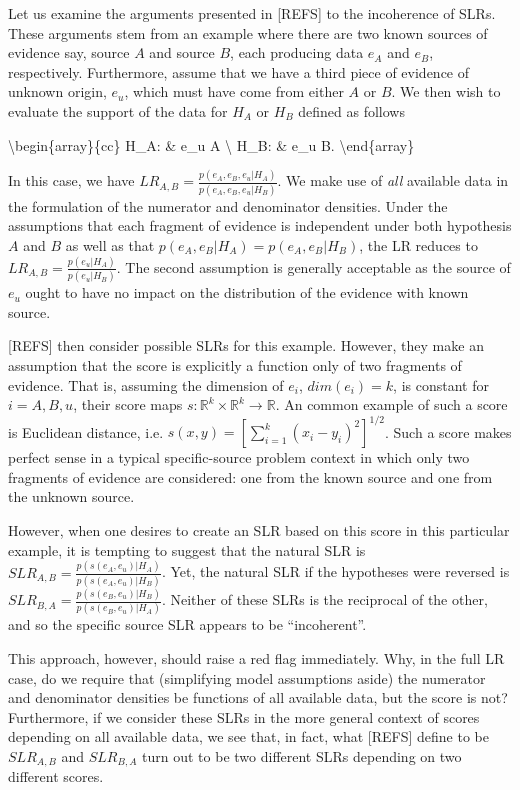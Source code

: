 \documentclass[]{book}
\begin{document}
Let us examine the arguments presented in {[}REFS{]} to the incoherence of SLRs. These arguments stem from an example where there are two known sources of evidence say, source \(A\) and source \(B\), each producing data \(e_A\) and \(e_B\), respectively. Furthermore, assume that we have a third piece of evidence of unknown origin, \(e_u\), which must have come from either \(A\) or \(B\). We then wish to evaluate the support of the data for \(H_A\) or \(H_B\) defined as follows

\textbackslash{}begin\{array\}\{cc\}
H\_A: \& e\_u  A \textbackslash{}
H\_B: \& e\_u  B.
\textbackslash{}end\{array\}

In this case, we have \(LR_{A,B} = \frac{p(e_A, e_B, e_u|H_A)}{p(e_A, e_B, e_u|H_B)}\). We make use of \emph{all} available data in the formulation of the numerator and denominator densities. Under the assumptions that each fragment of evidence is independent under both hypothesis \(A\) and \(B\) as well as that \(p(e_A,e_B|H_A) = p(e_A,e_B|H_B)\), the LR reduces to \(LR_{A,B} = \frac{p(e_u|H_A)}{p(e_u|H_B)}\). The second assumption is generally acceptable as the source of \(e_u\) ought to have no impact on the distribution of the evidence with known source.

{[}REFS{]} then consider possible SLRs for this example. However, they make an assumption that the score is explicitly a function only of two fragments of evidence. That is, assuming the dimension of \(e_i\), \(dim(e_i) = k\), is constant for \(i = A,B,u\), their score maps \(s:\mathbb{R}^k \times \mathbb{R}^k \rightarrow \mathbb{R}\). An common example of such a score is Euclidean distance, i.e. \(s(x,y) = \left[ \sum_{i = 1}^{k}(x_i - y_i)^2 \right]^{1/2}\). Such a score makes perfect sense in a typical specific-source problem context in which only two fragments of evidence are considered: one from the known source and one from the unknown source.

However, when one desires to create an SLR based on this score in this particular example, it is tempting to suggest that the natural SLR is \(SLR_{A,B} = \frac{p(s(e_A,e_u)|H_A)}{p(s(e_A,e_u)|H_B)}\). Yet, the natural SLR if the hypotheses were reversed is \(SLR_{B,A} = \frac{p(s(e_B,e_u)|H_B)}{p(s(e_B,e_u)|H_A)}\). Neither of these SLRs is the reciprocal of the other, and so the specific source SLR appears to be ``incoherent''.

This approach, however, should raise a red flag immediately. Why, in the full LR case, do we require that (simplifying model assumptions aside) the numerator and denominator densities be functions of all available data, but the score is not? Furthermore, if we consider these SLRs in the more general context of scores depending on all available data, we see that, in fact, what {[}REFS{]} define to be \(SLR_{A,B}\) and \(SLR_{B,A}\) turn out to be two different SLRs depending on two different scores.
\end{document}
